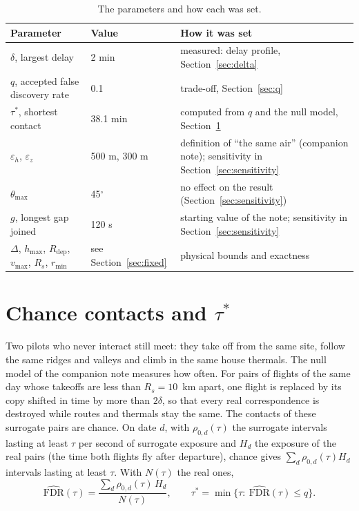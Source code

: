 \documentclass[11pt,a4paper]{article}
\begin{document}
\begin{table}[h]
\centering
\small
\begin{tabularx}{\textwidth}{@{}l l X@{}}
\toprule
Parameter & Value & How it was set \\
\midrule
$\delta$, largest delay & 2 min & measured: delay profile, Section~\ref{sec:delta} \\
$q$, accepted false discovery rate & 0.1 & trade-off, Section~\ref{sec:q} \\
$\tau^*$, shortest contact & 38.1 min & computed from $q$ and the null model, Section~\ref{sec:fdr} \\
$\varepsilon_h$, $\varepsilon_z$ & 500 m, 300 m & definition of ``the same air'' (companion note); sensitivity in Section~\ref{sec:sensitivity} \\
$\theta_{\max}$ & 45$^\circ$ & no effect on the result (Section~\ref{sec:sensitivity}) \\
$g$, longest gap joined & 120 s & starting value of the note; sensitivity in Section~\ref{sec:sensitivity} \\
$\Delta$, $h_{\max}$, $R_\mathrm{dep}$, $v_{\max}$, $R_s$, $r_{\min}$ & see Section~\ref{sec:fixed} & physical bounds and exactness \\
\bottomrule
\end{tabularx}
\caption{The parameters and how each was set.}
\label{tab:parameters}
\end{table}

\section{Chance contacts and $\tau^*$}\label{sec:fdr}

Two pilots who never interact still meet: they take off from the same site, follow the same
ridges and valleys and climb in the same house thermals. The null model of the companion
note measures how often. For pairs of flights of the same day whose takeoffs are less than
$R_s=10$~km apart, one flight is replaced by its copy shifted in time by more than $2\delta$,
so that every real correspondence is destroyed while routes and thermals stay the same. The
contacts of these surrogate pairs are chance. On date $d$, with $\rho_{0,d}(\tau)$ the
surrogate intervals lasting at least $\tau$ per second of surrogate exposure and $H_d$ the
exposure of the real pairs (the time both flights fly after departure), chance gives
$\sum_d \rho_{0,d}(\tau) H_d$ intervals lasting at least $\tau$. With $N(\tau)$ the real ones,
\begin{equation}\label{eq:fdr}
  \widehat{\mathrm{FDR}}(\tau)=\frac{\sum_d \rho_{0,d}(\tau)\,H_d}{N(\tau)},\qquad
  \tau^*=\min\bigl\{\tau:\ \widehat{\mathrm{FDR}}(\tau)\le q\bigr\}.
\end{equation}
\end{document}
